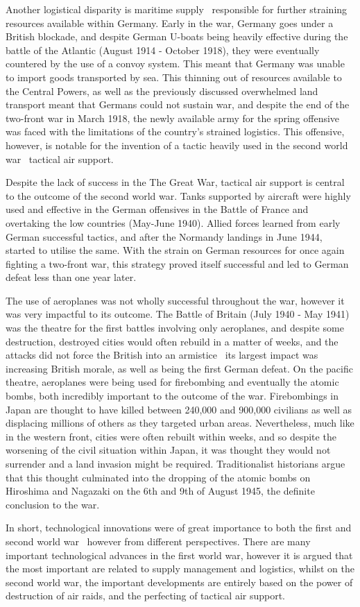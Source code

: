 \documentclass[12pt,a4paper]{article}
\begin{document}
Another logistical disparity is maritime supply \textendash\ responsible for further straining resources available within Germany. Early in the war, Germany goes under a British blockade, and despite German U-boats being heavily effective during the battle of the Atlantic (August 1914 - October 1918), they were eventually countered by the use of a convoy system. This meant that Germany was unable to import goods transported by sea. This thinning out of resources available to the Central Powers, as well as the previously discussed overwhelmed land transport meant that Germans could not sustain war, and despite the end of the two-front war in March 1918, the newly available army for the spring offensive was faced with the limitations of the country's strained logistics. This offensive, however, is notable for the invention of a tactic heavily used in the second world war \textendash\ tactical air support.

Despite the lack of success in the The Great War, tactical air support is central to the outcome of the second world war. Tanks supported by aircraft were highly used and effective in the German offensives in the Battle of France and overtaking the low countries (May-June 1940). Allied forces learned from early German successful tactics, and after the Normandy landings in June 1944, started to utilise the same. With the strain on German resources for once again fighting a two-front war, this strategy proved itself successful and led to German defeat less than one year later.

The use of aeroplanes was not wholly successful throughout the war, however it was very impactful to its outcome. The Battle of Britain (July 1940 - May 1941) was the theatre for the first battles involving only aeroplanes, and despite some destruction, destroyed cities would often rebuild in a matter of weeks, and the attacks did not force the British into an armistice \textendash\ its largest impact was increasing British morale, as well as being the first German defeat. On the pacific theatre, aeroplanes were being used for firebombing and eventually the atomic bombs, both incredibly important to the outcome of the war. Firebombings in Japan are thought to have killed between 240,000 and 900,000 civilians as well as displacing millions of others as they targeted urban areas. Nevertheless, much like in the western front, cities were often rebuilt within weeks, and so despite the worsening of the civil situation within Japan, it was thought they would not surrender and a land invasion might be required. Traditionalist historians argue that this thought culminated into the dropping of the atomic bombs on Hiroshima and Nagazaki on the 6th and 9th of August 1945, the definite conclusion to the war. 

In short, technological innovations were of great importance to both the first and second world war \textendash\ however from different perspectives. There are many important technological advances in the first world war, however it is argued that the most important are related to supply management and logistics, whilst on the second world war, the important developments are entirely based on the power of destruction of air raids, and the perfecting of tactical air support.


	
\end{document}
